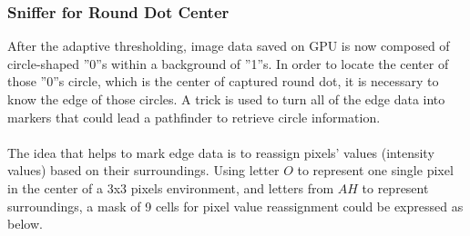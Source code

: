 \subsubsection{Sniffer for Round Dot Center}
After the adaptive thresholding, image data saved on GPU is now composed of circle-shaped ''0''s within a background of ''1''s. In order to locate the center of those ''0''s circle, which is the center of captured round dot, it is necessary to know the edge of those circles. A trick is used to turn all of the edge data into markers that could lead a pathfinder to retrieve circle information.%
\\\\%
The idea that helps to mark edge data is to reassign pixels' values (intensity values) based on their surroundings. Using letter \(O\) to represent one single pixel in the center of a 3x3 pixels environment, and letters from \(A\)\texttildelow \(H\) to represent surroundings, a mask of 9 cells for pixel value reassignment could be expressed as below.

